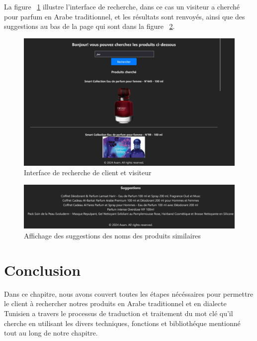 \noindent
La figure ~\ref{fig:interfacerecherche} illustre l'interface de recherche, dans ce cas un visiteur a cherché pour parfum en Arabe traditionnel, et les résultats sont renvoyés, ainsi que des suggestions au bas de la page qui sont dans la figure ~\ref{fig:suggestions}.


\begin{figure}[H]
	\centering
	\includegraphics[width=1\textwidth]{logos/interfacerecherche.png}
	\caption{Interface de recherche de client et visiteur}
	\label{fig:interfacerecherche}
\end{figure}

\begin{figure}[H]
	\centering
	\includegraphics[width=1\textwidth]{logos/suggestions.png}
	\caption{Affichage des suggestions des noms des produits similaires}
	\label{fig:suggestions}
\end{figure}


\section{Conclusion}
\noindent
Dans ce chapitre, nous avons couvert toutes les étapes nécéssaires pour permettre le client à rechercher notres produits en Arabe traditionnel et en dialecte Tunisien a travers le processus de traduction et traitement du mot clé qu'il cherche en utilisant les divers techniques, fonctions et bibliothéque mentionné tout au long de notre chapitre.